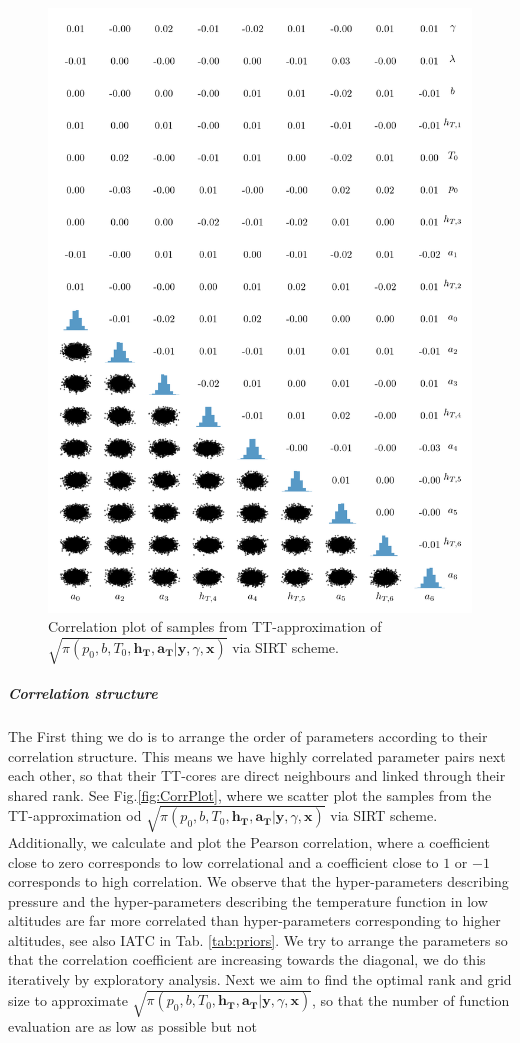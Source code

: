 \begin{figure}%
	\includegraphics[]{2ndCorrPlot.png}
	\caption*{Correlation plot of samples from TT-approximation of $\sqrt{\pi(p_0,b,T_0,\bm{h_T},\bm{a_T} | \bm{y}, \gamma, \bm{x})}$ via SIRT scheme.}
\end{figure}
\cleardoublepage
\subparagraph{Correlation structure}
The First thing we do is to arrange the order of parameters according to their correlation structure.
This means we have highly correlated parameter pairs next each other, so that their TT-cores are direct neighbours and linked through their shared rank.
See Fig.\ref{fig:CorrPlot}, where we scatter plot the samples from the TT-approximation od $\sqrt{\pi(p_0,b,T_0,\bm{h_T},\bm{a_T} | \bm{y}, \gamma, \bm{x})}$ via SIRT scheme.
Additionally, we calculate and plot the Pearson correlation, where a coefficient close to zero corresponds to low correlational and a coefficient close to $1$ or $-1$ corresponds to high correlation.
We observe that the hyper-parameters describing pressure and the hyper-parameters describing the temperature function in low altitudes are far more correlated than hyper-parameters corresponding to higher altitudes, see also IATC in Tab. \ref{tab:priors}.
We try to arrange the parameters so that the correlation coefficient are increasing towards the diagonal, we do this iteratively by exploratory analysis.
Next we aim to find the optimal rank and grid size to approximate $\sqrt{\pi(p_0,b,T_0,\bm{h_T},\bm{a_T} | \bm{y}, \gamma, \bm{x})}$, so that the number of function evaluation are as low as possible but not 

